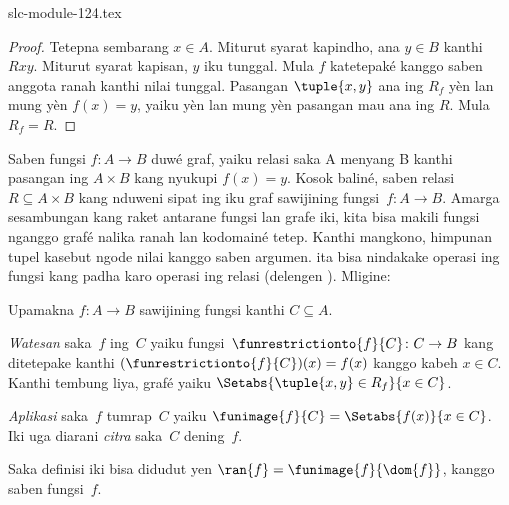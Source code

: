 \begin{filecontents*}[overwrite]{slc-module-124.tex}
\begin{proof}
Tetepna sembarang $x \in A$. Miturut syarat kapindho, ana $y \in B$ kanthi
$Rxy$. Miturut syarat kapisan, $y$ iku tunggal. Mula $f$ katetepaké
kanggo saben anggota ranah kanthi nilai tunggal. Pasangan
$\tuple{x,y}$ ana ing $R_f$ yèn lan mung yèn $f(x)=y$, yaiku yèn lan
mung yèn pasangan mau ana ing $R$. Mula $R_f=R$.
\end{proof}

\begin{explain}
Saben fungsi $f\colon A \to B$ duwé graf, yaiku relasi saka A menyang B kanthi pasangan ing $A
\times B$ kang nyukupi $f(x) = y$. Kosok baliné, saben relasi~$R
\subseteq A \times B$ kang nduweni sipat ing
 iku graf sawijining fungsi~$f \colon A \to
B$. Amarga sesambungan kang raket antarane fungsi lan grafe iki,
kita bisa makili fungsi nganggo grafé nalika ranah lan kodomainé tetep.
Kanthi mangkono, himpunan tupel kasebut ngode nilai kanggo saben argumen. ita bisa nindakake operasi ing
fungsi kang padha karo operasi ing relasi (delengen
). Mligine:
\end{explain}

\begin{defn}
Upamakna $f \colon A \to B$ sawijining fungsi kanthi $C\subseteq A$.

\emph{Watesan} saka~$f$ ing~$C$ yaiku
fungsi~$\funrestrictionto{f}{C}\colon C \to B$ kang ditetepake kanthi
$(\funrestrictionto{f}{C})(x) = f(x)$ kanggo kabeh $x \in C$. Kanthi tembung
liya, grafé yaiku $\Setabs{\tuple{x, y} \in R_f}{x \in
C}$.

\emph{Aplikasi} saka~$f$ tumrap~$C$ yaiku $\funimage{f}{C} =
\Setabs{f(x)}{x \in C}$. Iki uga diarani \emph{citra} saka~$C$
dening~$f$.
\end{defn}

\begin{explain}
Saka definisi iki bisa didudut yen $\ran{f} =
\funimage{f}{\dom{f}}$, kanggo saben fungsi~$f$.
\end{explain}


\end{filecontents*}

